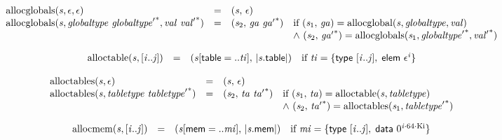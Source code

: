 $$
\begin{array}{@{}lcl@{}l@{}}
{\mathrm{allocglobals}}({\mathit{s}}, \epsilon, \epsilon) &=& ({\mathit{s}},\, \epsilon) &  \\
{\mathrm{allocglobals}}({\mathit{s}}, {\mathit{globaltype}}~{{\mathit{globaltype}'}^\ast}, {\mathit{val}}~{{\mathit{val}'}^\ast}) &=& ({\mathit{s}}_{{2}},\, {\mathit{ga}}~{{\mathit{ga}'}^\ast}) &\quad
  \mbox{if}~({\mathit{s}}_{{1}},\, {\mathit{ga}}) = {\mathrm{allocglobal}}({\mathit{s}}, {\mathit{globaltype}}, {\mathit{val}}) \\
 &&&\quad {\land}~({\mathit{s}}_{{2}},\, {{\mathit{ga}'}^\ast}) = {\mathrm{allocglobals}}({\mathit{s}}_{{1}}, {{\mathit{globaltype}'}^\ast}, {{\mathit{val}'}^\ast}) \\
\end{array}
$$

$$
\begin{array}{@{}lcl@{}l@{}}
{\mathrm{alloctable}}({\mathit{s}}, [{\mathit{i}} .. {\mathit{j}}]) &=& ({\mathit{s}}[\mathsf{table} = ..{\mathit{ti}}],\, {|{\mathit{s}}.\mathsf{table}|}) &\quad
  \mbox{if}~{\mathit{ti}} = \{ \begin{array}[t]{@{}l@{}}
\mathsf{type}~[{\mathit{i}} .. {\mathit{j}}],\; \mathsf{elem}~{\epsilon^{{\mathit{i}}}} \}\end{array} \\
\end{array}
$$

$$
\begin{array}{@{}lcl@{}l@{}}
{\mathrm{alloctables}}({\mathit{s}}, \epsilon) &=& ({\mathit{s}},\, \epsilon) &  \\
{\mathrm{alloctables}}({\mathit{s}}, {\mathit{tabletype}}~{{\mathit{tabletype}'}^\ast}) &=& ({\mathit{s}}_{{2}},\, {\mathit{ta}}~{{\mathit{ta}'}^\ast}) &\quad
  \mbox{if}~({\mathit{s}}_{{1}},\, {\mathit{ta}}) = {\mathrm{alloctable}}({\mathit{s}}, {\mathit{tabletype}}) \\
 &&&\quad {\land}~({\mathit{s}}_{{2}},\, {{\mathit{ta}'}^\ast}) = {\mathrm{alloctables}}({\mathit{s}}_{{1}}, {{\mathit{tabletype}'}^\ast}) \\
\end{array}
$$

$$
\begin{array}{@{}lcl@{}l@{}}
{\mathrm{allocmem}}({\mathit{s}}, [{\mathit{i}} .. {\mathit{j}}]) &=& ({\mathit{s}}[\mathsf{mem} = ..{\mathit{mi}}],\, {|{\mathit{s}}.\mathsf{mem}|}) &\quad
  \mbox{if}~{\mathit{mi}} = \{ \begin{array}[t]{@{}l@{}}
\mathsf{type}~[{\mathit{i}} .. {\mathit{j}}],\; \mathsf{data}~{0^{{\mathit{i}} \cdot 64 \cdot {\mathrm{Ki}}}} \}\end{array} \\
\end{array}
$$

